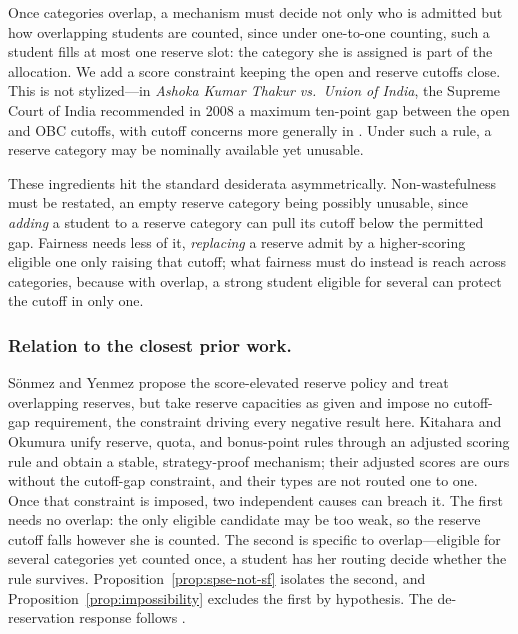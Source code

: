 \documentclass[a4paper,twoside]{article}
\theoremstyle{definition}
\begin{document}
Once categories overlap, a mechanism must decide not only who is admitted but how overlapping students are counted, since under one-to-one counting, such a student fills at most one reserve slot: the category she is assigned is part of the allocation. We add a score constraint keeping the open and reserve cutoffs close. This is not stylized---in \emph{Ashoka Kumar Thakur vs.\ Union of India}, the Supreme Court of India recommended in 2008 a maximum ten-point gap between the open and OBC cutoffs, with cutoff concerns more generally in \cite{AyTu23a,ABB24a}. Under such a rule, a reserve category may be nominally available yet unusable.

These ingredients hit the standard desiderata \cite{EHYY14a,KHIY17a,GKK+17a} asymmetrically. Non-wastefulness must be restated, an empty reserve category being possibly unusable, since \emph{adding} a student to a reserve category can pull its cutoff below the permitted gap. Fairness needs less of it, \emph{replacing} a reserve admit by a higher-scoring eligible one only raising that cutoff; what fairness must do instead is reach across categories, because with overlap, a strong student eligible for several can protect the cutoff in only one.

\subsubsection{Relation to the closest prior work.}
S\"onmez and Yenmez \cite{SoYe22a} propose the score-elevated reserve policy and treat overlapping reserves, but take reserve capacities as given and impose no cutoff-gap requirement, the constraint driving every negative result here. Kitahara and Okumura \cite{KiOk26a} unify reserve, quota, and bonus-point rules through an adjusted scoring rule and obtain a stable, strategy-proof mechanism; their adjusted scores are ours without the cutoff-gap constraint, and their types are not routed one to one. Once that constraint is imposed, two independent causes can breach it. The first needs no overlap: the only eligible candidate may be too weak, so the reserve cutoff falls however she is counted. The second is specific to overlap---eligible for several categories yet counted once, a student has her routing decide whether the rule survives. Proposition~\ref{prop:spse-not-sf} isolates the second, and Proposition~\ref{prop:impossibility} excludes the first by hypothesis. The de-reservation response follows \cite{AyTu23a}.
\end{document}
